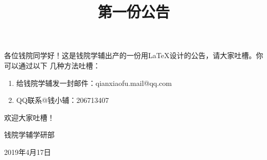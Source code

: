 \documentclass{qyxf-notice}
\title{第一份公告}
\begin{document}
\maketitle

各位钱院同学好！这是钱院学辅出产的一份用\LaTeX 设计的公告，请大家吐槽。你可以通过以下
几种方法吐槽：
\begin{enumerate}[\quad\bf(1)]
    \item 给钱院学辅发一封邮件：qianxiaofu.mail@qq.com
    \item QQ联系@钱小辅：206713407
\end{enumerate}

欢迎大家吐槽！

\begin{flushright}
钱院学辅学研部

2019年4月17日
\end{flushright}
\end{document}
